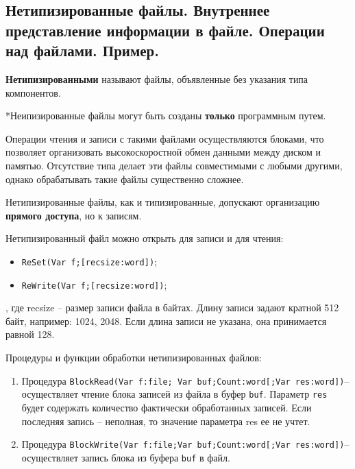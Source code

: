
\newpage\subsection{Нетипизированные  файлы.  Внутреннее  представление  информации  в  файле.  Операции 
над файлами. Пример. }

\begin{myquote}
            
\end{myquote}

\noindent
{\bf{Нетипизированными}} называют файлы, объявленные без указания типа компонентов.

\noindent
*Неипизированные файлы могут быть созданы {\bf только} программным путем.

Операции чтения и записи с такими файлами осуществляются блоками, что позволяет организовать высокоскоростной обмен данными между диском и памятью. Отсутствие типа делает эти файлы совместимыми с любыми другими, однако обрабатывать такие файлы существенно сложнее.


Нетипизированные файлы, как и типизированные, допускают организацию {\bf{прямого доступа}}, но к записям.

\noindent
Нетипизированный файл можно открыть для записи и для чтения:
\begin{itemize}
         \item \texttt{ReSet(Var f;[recsize:word])};
         \item \texttt{ReWrite(Var f;[recsize:word])};
\end{itemize}

\noindent
, где recsize – размер записи файла в байтах. Длину записи задают кратной 512 байт, например:  1024, 2048. Если длина записи не указана, она принимается равной 128.

\noindent
Процедуры и функции обработки нетипизированных файлов:
\begin{enumerate}
    \item Процедура \texttt{BlockRead(Var f:file; Var buf;Count:word[;Var res:word])}– осуществляет чтение блока записей из файла в буфер \texttt{buf}. 
Параметр \texttt{res} будет содержать количество фактически обработанных записей. Если последняя запись – неполная, то значение параметра res ее не учтет. 
    \item Процедура \texttt{BlockWrite(Var f:file;Var buf;Count:word[;Var res:word])}– осуществляет запись блока из буфера \texttt{buf} в файл.
\end{enumerate}

